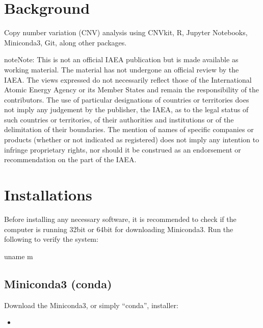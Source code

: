 \documentclass[letterpaper,10pt,english]{sphinxhowto}
\begin{document}
\pagestyle{plain}
\sphinxtableofcontents
\pagestyle{normal}
\label{\detokenize{index::doc}}



\section{Background}
\label{\detokenize{index:background}}
\sphinxAtStartPar
\sphinxstylestrong{{[}DRAFT{]}}

\sphinxAtStartPar
Copy number variation (CNV) analysis using CNVkit, R, Jupyter Notebooks, Miniconda3, Git, along other packages.

\begin{sphinxadmonition}{note}{Note:}
\sphinxAtStartPar
This is not an official IAEA publication but is made available as working material. The material has not undergone an official review by the IAEA. The views expressed do not necessarily reflect those of the International Atomic Energy Agency or its Member States and remain the responsibility of the contributors. The use of particular designations of countries or territories does not imply any judgement by the publisher, the IAEA, as to the legal status of such countries or territories, of their authorities and institutions or of the delimitation of their boundaries. The mention of names of specific companies or products (whether or not indicated as registered) does not imply any intention to infringe proprietary rights, nor should it be construed as an endorsement or recommendation on the part of the IAEA.
\end{sphinxadmonition}


\section{Installations}
\label{\detokenize{index:installations}}
\sphinxAtStartPar
Before installing any necessary software, it is recommended to check if the computer is running 32\sphinxhyphen{}bit or 64\sphinxhyphen{}bit for downloading Miniconda3. Run the following to verify the system:

\begin{sphinxVerbatim}[commandchars=\\\{\}]
\PYGZdl{} uname \PYGZhy{}m
\end{sphinxVerbatim}


\subsection{Miniconda3 (conda)}
\label{\detokenize{index:miniconda3-conda}}
\sphinxAtStartPar
Download the Miniconda3, or simply “conda”, installer:
\begin{itemize}
\item {} 
\sphinxAtStartPar
{}

\end{itemize}
\end{document}

